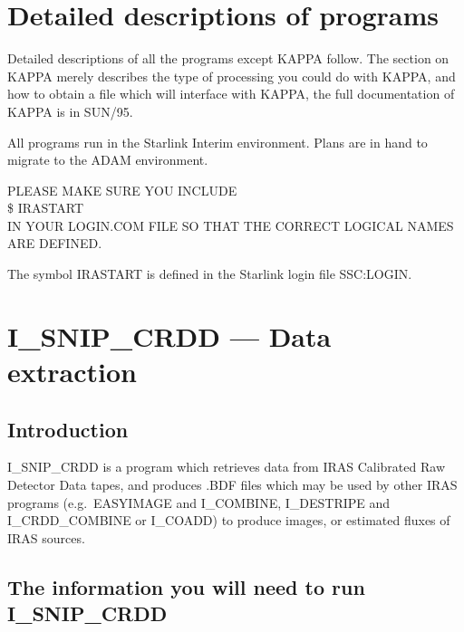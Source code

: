 \section {Detailed descriptions of programs}
                                                                       

Detailed descriptions of all the programs except KAPPA follow. The section on
KAPPA merely describes the type of processing you could do with KAPPA, and how
to obtain a file which will interface with KAPPA, the full documentation of 
KAPPA is in SUN/95.

All programs run in the Starlink Interim environment. Plans are in hand to
migrate to the ADAM environment.

\begin{center}
\large{PLEASE MAKE SURE YOU INCLUDE
\\
\$ IRASTART
\\
IN YOUR LOGIN.COM FILE SO THAT THE CORRECT LOGICAL NAMES ARE DEFINED.}
\end{center}
The symbol IRASTART is defined in the Starlink login file SSC:LOGIN.

\pagebreak
\section {I\_SNIP\_CRDD --- Data extraction}

\subsection {Introduction}

I\_SNIP\_CRDD is a program which retrieves data from IRAS Calibrated Raw 
Detector Data tapes, and produces .BDF files which may be used by other IRAS 
programs (e.g.\ EASYIMAGE and I\_COMBINE, I\_DESTRIPE and I\_CRDD\_COMBINE or 
I\_COADD) to produce images, or estimated fluxes of IRAS sources.


\subsection {The information you will need to run I\_SNIP\_CRDD}

